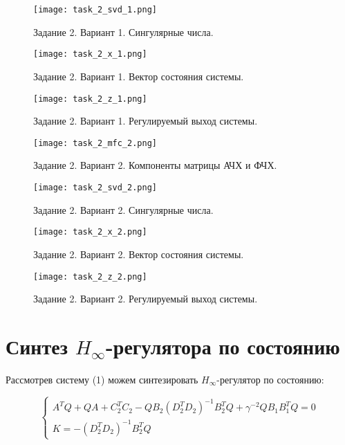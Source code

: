 \begin{figure}[]
    \centering
    \texttt{[image: task\_2\_svd\_1.png]}
    \caption{\label{fig:task2_1_2}Задание 2. Вариант 1. Сингулярные числа.}
\end{figure}

\begin{figure}[]
    \centering
    \texttt{[image: task\_2\_x\_1.png]}
    \caption{\label{fig:task2_1_3}Задание 2. Вариант 1. Вектор состояния системы.}
\end{figure}

\begin{figure}[]
    \centering
    \texttt{[image: task\_2\_z\_1.png]}
    \caption{\label{fig:task2_1_4}Задание 2. Вариант 1. Регулируемый выход системы.}
\end{figure}

\begin{figure}[]
    \centering
    \texttt{[image: task\_2\_mfc\_2.png]}
    \caption{\label{fig:task2_2_1}Задание 2. Вариант 2. Компоненты матрицы АЧХ и ФЧХ.}
\end{figure}

\begin{figure}[]
    \centering
    \texttt{[image: task\_2\_svd\_2.png]}
    \caption{\label{fig:task2_2_2}Задание 2. Вариант 2. Сингулярные числа.}
\end{figure}

\begin{figure}[]
    \centering
    \texttt{[image: task\_2\_x\_2.png]}
    \caption{\label{fig:task2_2_3}Задание 2. Вариант 2. Вектор состояния системы.}
\end{figure}

\begin{figure}[]
    \centering
    \texttt{[image: task\_2\_z\_2.png]}
    \caption{\label{fig:task2_2_4}Задание 2. Вариант 2. Регулируемый выход системы.}
\end{figure}

\pagebreak

\section{Синтез $H_\infty$-регулятора по состоянию}

Рассмотрев систему (1) можем синтезировать $H_\infty$-регулятор по состоянию:

\begin{equation}
    \begin{cases}
        A^TQ + QA +C_2^TC_2 - QB_2(D_2^TD_2)^{-1}B_2^TQ + \gamma^{-2}QB_1B_1^TQ=0 \\
        K = -(D_2^TD_2)^{-1}B_2^TQ
    \end{cases}
\end{equation}

